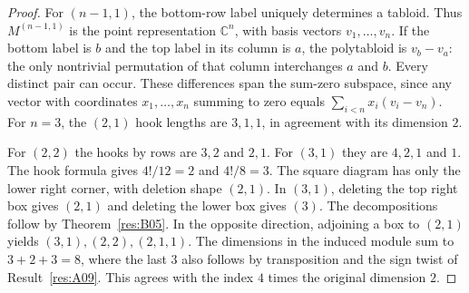 \begin{proof}
For \((n-1,1)\), the bottom-row label uniquely determines a tabloid.
Thus \(M^{(n-1,1)}\) is the point representation
\(\mathbb C^n\), with basis vectors \(v_1,\ldots,v_n\).
If the bottom label is \(b\) and the top label in its column is
\(a\), the polytabloid is \(v_b-v_a\): the only nontrivial
permutation of that column interchanges \(a\) and \(b\). Every
distinct pair can occur. These differences span the sum-zero
subspace, since any vector with coordinates \(x_1,\ldots,x_n\)
summing to zero equals \(\sum_{i<n}x_i(v_i-v_n)\).
For \(n=3\), the \((2,1)\) hook lengths are \(3,1,1\), in
agreement with its dimension \(2\).

For \((2,2)\) the hooks by rows are \(3,2\) and \(2,1\).
For \((3,1)\) they are \(4,2,1\) and \(1\). The hook formula gives
\(4!/12=2\) and \(4!/8=3\). The square diagram has only the lower
right corner, with deletion shape \((2,1)\). In \((3,1)\), deleting
the top right box gives \((2,1)\) and deleting the lower box gives
\((3)\). The decompositions follow by Theorem~\ref{res:B05}.
In the opposite direction, adjoining a box to \((2,1)\) yields
\((3,1),(2,2),(2,1,1)\). The dimensions in the induced module sum
to \(3+2+3=8\), where the last \(3\) also follows by transposition
and the sign twist of Result~\ref{res:A09}. This agrees with the
index \(4\) times the original dimension \(2\).
\end{proof}
